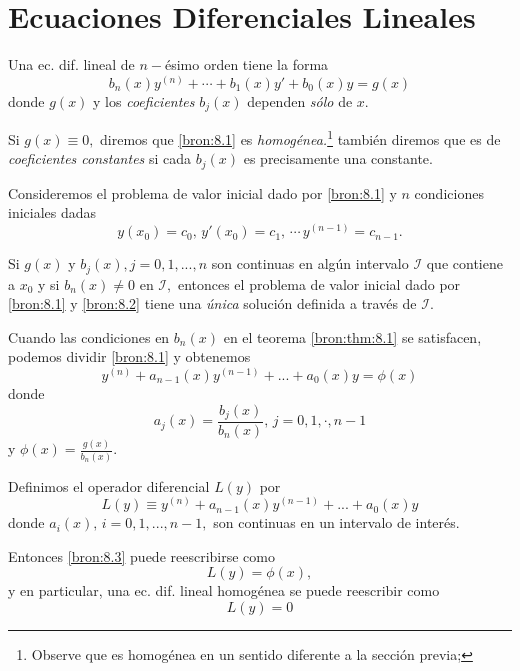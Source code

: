 \section{Ecuaciones Diferenciales Lineales}


	Una ec. dif. lineal de $n-$\'esimo orden tiene la forma
	\[
		\label{bron:8.1}
		b_{n}(x)y^{(n)}+\cdots+b_{1}(x)y'+b_{0}(x)y=g(x)
	\]
	donde $g(x)$ y los \emph{coeficientes} $b_{j}(x)$ dependen \emph{s\'olo} de $x.$



	Si $g(x)\equiv 0,$ diremos que \eqref{bron:8.1} es \emph{homog\'enea.}\footnote{Observe que es homog\'enea en un sentido diferente a la secci\'on previa;} tambi\'en diremos que es de \emph{coeficientes constantes} si cada $b_{j}(x)$ es precisamente una constante.




	\begin{teorema}
		\label{bron:thm:8.1}
		Consideremos el problema de valor inicial dado por \eqref{bron:8.1} y $n$ condiciones iniciales dadas
		\[
			\label{bron:8.2}
			y(x_{0})=c_{0}, \, y'(x_{0})=c_{1}, \, \cdots \, y^{(n-1)}=c_{n-1}.
		\]

		Si $g(x)$ y $b_{j}(x), j=0,1,...,n$ son continuas en algún intervalo $\mathcal{I}$ que contiene a $x_{0}$ y si $b_{n}(x)\neq 0$ en $\mathcal{I},$ entonces el problema de valor inicial dado por \eqref{bron:8.1} y \eqref{bron:8.2} tiene una \emph{única} soluci\'on definida a trav\'es de $\mathcal{I}.$
	\end{teorema}




	Cuando las condiciones en $b_{n}(x)$ en el teorema \ref{bron:thm:8.1} se satisfacen, podemos dividir \eqref{bron:8.1} y obtenemos
	\[
		\label{bron:8.3}
		y^{(n)}+a_{n-1}(x)y^{(n-1)}+...+a_{0}(x)y=\phi(x)
	\]
	donde $$a_{j}(x)=\dfrac{b_{j}(x)}{b_{n}(x)}, \, j=0,1,\cdot, n-1$$ y
	$\phi(x)=\frac{g(x)}{b_{n}(x)}.$




	Definimos el operador diferencial $L(y)$ por
	\[
		\label{bron:8.4}
		L(y)\equiv y^{(n)}+a_{n-1}(x)y^{(n-1)}+...+a_{0}(x)y
	\]
	donde $a_{i}(x), \, i=0,1,...,n-1,$ son continuas en un intervalo de inter\'es.




	Entonces \eqref{bron:8.3} puede reescribirse como
	\[
		\label{bron:8.5}
		L(y)=\phi(x),
	\]
	y en particular, una ec. dif. lineal homog\'enea se puede reescribir como
	\[
		\label{bron:8.6}
		L(y)=0
	\]



